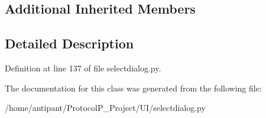 \subsection*{Additional Inherited Members}


\subsection{Detailed Description}


Definition at line 137 of file selectdialog.\-py.



The documentation for this class was generated from the following file\-:\begin{DoxyCompactItemize}
\item 
/home/antipant/\-Protocol\-P\-\_\-\-Project/\-U\-I/selectdialog.\-py\end{DoxyCompactItemize}

